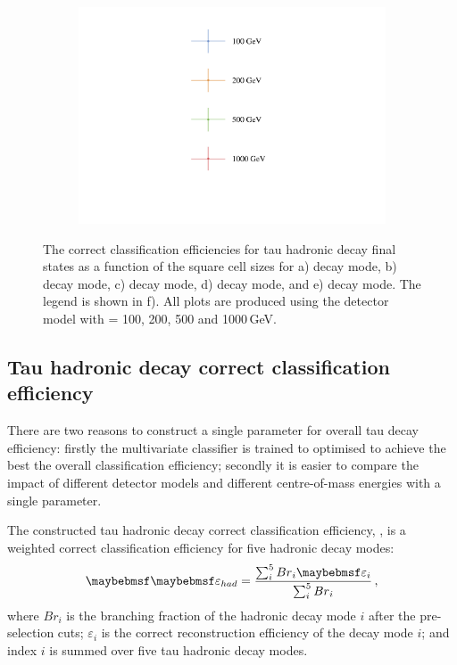 \begin{figure}[htbp]
\begin{subfigure}[b]{0.45\textwidth}
  \caption{}
  \label{fig:tauDecayMode6}
\end{subfigure}
\begin{subfigure}[b]{0.45\textwidth}
  \includegraphics[width=\textwidth]{tau/plots3/legend.pdf}
  \caption{}
  \label{fig:tauDecayLegend}
\end{subfigure}
\caption[The correct classification efficiency for  tau hadronic decay final states  as a function of the \ECAL square cell sizes]
{ The correct classification efficiencies for  tau hadronic decay final states  as a function of the \ECAL square cell sizes for a) \decayPionShort decay mode, b) \decayRhoShortest decay mode, c) \decayAiPhotonShortest decay mode, d) \decayAiPionShortest decay mode, and e) \decayThreePionPhotonShort decay mode. The legend is shown in f). All plots are produced using  the \ILD detector model with \sqrtS = 100, 200, 500 and 1000\,GeV.}
\label{fig:TauPionEfficiency}
\end{figure}


\subsection{Tau hadronic decay correct classification efficiency}

There are two reasons to construct a single parameter for  overall tau decay efficiency: firstly the multivariate classifier is trained to optimised to achieve the best the overall classification efficiency; secondly it is easier to compare the impact of different detector models and different centre-of-mass energies with a single parameter.

The constructed tau hadronic decay correct classification efficiency, \tauHad, is a weighted correct classification efficiency for five hadronic decay modes:
\begin{equation}
\label{eq:had}
\tauHad = \frac{\sum_{i}^5 {Br}_{i}\varepsilon_{i}}{\sum_{i}^5 {Br}_{i}}  \,,
\end{equation}
where $Br_{i}$ is the branching fraction of the hadronic decay mode $i$  after the pre-selection cuts; $\varepsilon_{i}$ is the correct reconstruction efficiency of the decay mode $i$; and index $i$ is summed over five tau hadronic decay modes.

